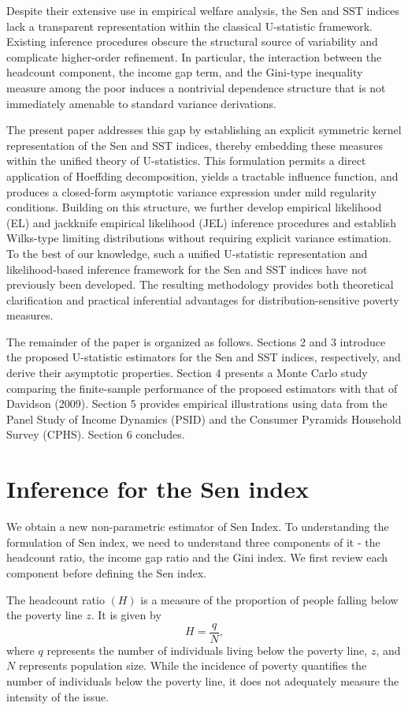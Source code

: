 \documentclass[11pt]{article}
\begin{document}
Despite their extensive use in empirical welfare analysis, the Sen and SST indices lack a transparent representation within the classical U-statistic framework. Existing inference procedures obscure the structural source of variability and complicate higher-order refinement. In particular, the interaction between the headcount component, the income gap term, and the Gini-type inequality measure among the poor induces a nontrivial dependence structure that is not immediately amenable to standard variance derivations.

The present paper addresses this gap by establishing an explicit symmetric kernel representation of the Sen and SST indices, thereby embedding these measures within the unified theory of U-statistics. This formulation permits a direct application of Hoeffding decomposition, yields a tractable influence function, and produces a closed-form asymptotic variance expression under mild regularity conditions. Building on this structure, we further develop empirical likelihood (EL) and jackknife empirical likelihood (JEL) inference procedures and establish Wilks-type limiting distributions without requiring explicit variance estimation. To the best of our knowledge, such a unified U-statistic representation and likelihood-based inference framework for the Sen and SST indices have not previously been developed. The resulting methodology provides both theoretical clarification and practical inferential advantages for distribution-sensitive poverty measures.

The remainder of the paper is organized as follows. Sections 2 and 3 introduce the proposed U-statistic estimators for the Sen and SST indices, respectively, and derive their asymptotic properties. Section 4 presents a Monte Carlo study comparing the finite-sample performance of the proposed estimators with that of Davidson (2009). Section 5 provides empirical illustrations using data from the Panel Study of Income Dynamics (PSID) and the Consumer Pyramids Household Survey (CPHS). Section 6 concludes.
\section{Inference for the Sen index}
We obtain a new non-parametric estimator of Sen Index.  To understanding the formulation of Sen index, we need to understand three components of it - the headcount ratio, the income gap ratio and the Gini index. We  first review each component before defining the Sen index.

The headcount ratio $(H)$ is a measure of the proportion of people falling below the poverty line $z$. It is given by
\begin{equation*}
H = \frac{q}{N},
\end{equation*}
where $q$ represents the number of individuals living below the poverty line, $z$, and $N$ represents population size. While the incidence of poverty quantifies the number of individuals below the poverty line, it does not adequately measure the intensity of the issue.
\end{document}
